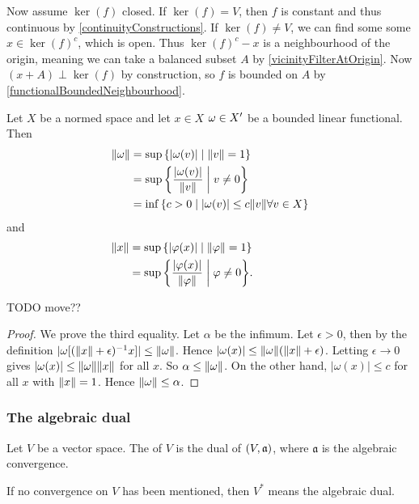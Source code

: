 Now assume $\ker(f)$ closed. If $\ker(f) = V$, then $f$ is constant and thus continuous by \ref{continuityConstructions}. If $\ker(f) \neq V$, we can find some some $x\in \ker(f)^c$, which is open. Thus $\ker(f)^c - x$ is a neighbourhood of the origin, meaning we can take a balanced subset $A$ by \ref{vicinityFilterAtOrigin}. Now $(x+A)\perp \ker(f)$ by construction, so $f$ is bounded on $A$ by \ref{functionalBoundedNeighbourhood}.


\begin{lemma} Let $X$ be a normed space and
let $x\in X$ $\omega\in {X}^\prime$ be a bounded linear functional. Then
\begin{align*}
\norm{\omega} &= \sup\setbuilder{|\omega(v)|}{\norm{v}=1 } \\
&= \sup\setbuilder{\frac{|\omega(v)|}{\norm{v}}}{v\neq 0} \\
&= \inf\setbuilder{c>0} {|\omega(v)|\leq c\norm{v}\forall v\in X}
\end{align*}
and
\begin{align*}
\norm{x} &= \sup\setbuilder{|\varphi(x)|}{ \norm{\varphi}=1} \qquad\qquad\quad\\ %
&= \sup\setbuilder{\frac{|\varphi(x)|}{\norm{\varphi}}}{\varphi\neq 0}.
\end{align*}
\end{lemma}
TODO move??
\begin{proof}
We prove the third equality. Let $\alpha$ be the infimum. Let $\epsilon>0$, then by the definition $|\omega[(\lVert x\rVert+\epsilon)^{-1}x]|\leq \lVert\omega\rVert$. Hence $|\omega(x)|\leq \lVert\omega\rVert(\lVert x\rVert+\epsilon)$. Letting $\epsilon\to 0$ gives $|\omega(x)|\leq \lVert\omega\rVert\lVert x\rVert$ for all $x$. So $\alpha\leq \lVert\omega\rVert$. On the other hand, $|\omega(x)|\leq c$ for all $x$ with $\lVert x\rVert=1$. Hence $\lVert\omega\rVert\leq \alpha$.
\end{proof}

\subsubsection{The algebraic dual}
\begin{definition}
Let $V$ be a vector space. The  of $V$ is the dual of $\left( V,\mathfrak{a} \right)$, where $\mathfrak{a}$ is the algebraic convergence.

If no convergence on $V$ has been mentioned, then $V^*$ means the algebraic dual.
\end{definition}

